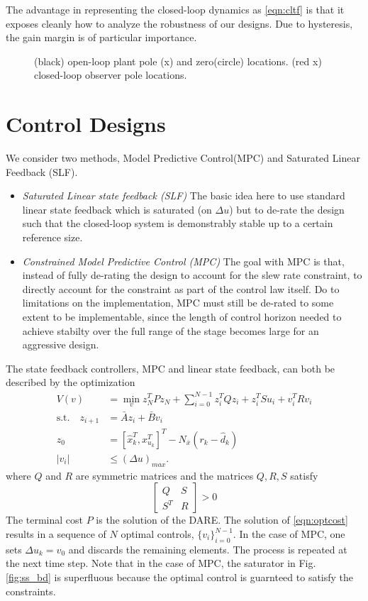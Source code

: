 \documentclass[journal,twocolumn,twoside]{IEEEtran}
\newcommand{\Ad}{\ensuremath{\bar A }\xspace}
\newcommand{\Bd}{\ensuremath{\bar B }\xspace}
\begin{document}
The advantage in representing the closed-loop dynamics as \eqref{eqn:cltf} is that it exposes cleanly how to analyze the robustness of our designs. Due to hysteresis, the gain margin is of particular importance. 


\begin{figure}
  
  \caption{(black) open-loop plant pole (x) and zero(circle) locations. (red x) closed-loop observer pole locations.}
  \label{fig:obs_cl}
\end{figure}


\section{Control Designs}
We consider two methods, Model Predictive Control(MPC) and Saturated Linear Feedback (SLF).
\begin{itemize}
\item\emph{Saturated Linear state feedback (SLF)} The basic idea here to use standard linear state feedback which is saturated (on $\Delta u$) but to de-rate the design such that the closed-loop system is demonstrably stable up to a certain reference size. 
\item\emph{Constrained Model Predictive Control (MPC)} The goal with MPC is that, instead of fully de-rating the design to account for the slew rate constraint, to directly account for the constraint as part of the control law itself. Do to limitations on the implementation, MPC must still be de-rated to some extent to be implementable, since the length of control horizon needed to achieve stabilty over the full range of the stage becomes large for an aggressive design.
\end{itemize}

The state feedback controllers, MPC and linear state feedback, can both be described by the optimization
\begin{align}
V(v) &= \min_{v} z^T_{N}Pz_{N} + \sum_{i=0}^{N-1}z_{i}^{T}Qz_{i} + z^T_iSu_i + v^{T}_{i}Rv_{i} \label{eqn:optcost}\\
 \text{s.t.} \quad z_{i+1} &= \Ad z_{i} + \Bd v_{i}\\
z_{0} &= [\hat{x}^T_{k}, x^T_{u_k}]^T - N_{\bar{x}}(r_k-\hat{d}_k)\\
|v_i | & \leq (\Delta u)_{max}.\label{eqn:cntrl_constraint}
\end{align}
where $Q$ and $R$ are symmetric matrices and the matrices $Q,R,S$ satisfy
\begin{equation}
  \begin{bmatrix}
    Q & S\\S^T &R
  \end{bmatrix} > 0
\end{equation}
The terminal cost $P$ is the solution of the DARE. The solution of \eqref{eqn:optcost} results in a sequence of $N$ optimal controls, $\{v_i\}_{i=0}^{N-1}$. In the case of MPC, one sets $\Delta u_k = v_0$ and discards the remaining elements. The process is repeated at the next time step. Note that in the case of MPC, the saturator in Fig. \ref{fig:ss_bd} is superfluous because the optimal control is guarnteed to satisfy the constraints.
\end{document}

